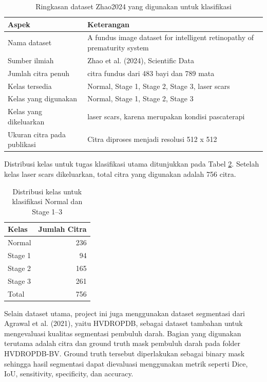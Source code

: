 \documentclass[12pt,a4paper]{article}
\begin{document}
\begin{table}[h]
\centering
\caption{Ringkasan dataset Zhao2024 yang digunakan untuk klasifikasi}
\label{tab:dataset-zhao}
\begin{tabular}{>{\raggedright\arraybackslash}p{4cm} >{\raggedright\arraybackslash}p{8cm}}
\toprule
\textbf{Aspek} & \textbf{Keterangan} \\
\midrule
Nama dataset & A fundus image dataset for intelligent retinopathy of prematurity system \\
Sumber ilmiah & Zhao et al. (2024), Scientific Data \\
Jumlah citra penuh & 1.099 citra fundus dari 483 bayi dan 789 mata \\
Kelas tersedia & Normal, Stage 1, Stage 2, Stage 3, laser scars \\
Kelas yang digunakan & Normal, Stage 1, Stage 2, Stage 3 \\
Kelas yang dikeluarkan & laser scars, karena merupakan kondisi pascaterapi \\
Ukuran citra pada publikasi & Citra diproses menjadi resolusi 512 x 512 \\
\bottomrule
\end{tabular}
\end{table}

Distribusi kelas untuk tugas klasifikasi utama ditunjukkan pada Tabel \ref{tab:kelas}. Setelah kelas laser scars dikeluarkan, total citra yang digunakan adalah 756 citra.

\begin{table}[h]
\centering
\caption{Distribusi kelas untuk klasifikasi Normal dan Stage 1--3}
\label{tab:kelas}
\begin{tabular}{l r}
\toprule
\textbf{Kelas} & \textbf{Jumlah Citra} \\
\midrule
Normal & 236 \\
Stage 1 & 94 \\
Stage 2 & 165 \\
Stage 3 & 261 \\
\midrule
Total & 756 \\
\bottomrule
\end{tabular}
\end{table}

Selain dataset utama, project ini juga menggunakan dataset segmentasi dari Agrawal et al. (2021), yaitu HVDROPDB, sebagai dataset tambahan untuk mengevaluasi kualitas segmentasi pembuluh darah. Bagian yang digunakan terutama adalah citra dan ground truth mask pembuluh darah pada folder HVDROPDB-BV. Ground truth tersebut diperlakukan sebagai binary mask sehingga hasil segmentasi dapat dievaluasi menggunakan metrik seperti Dice, IoU, sensitivity, specificity, dan accuracy.
\end{document}
